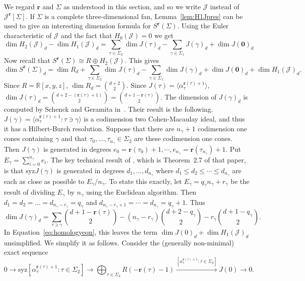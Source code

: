 \documentclass[11pt, reqno]{amsart}
\newcommand{\RR}{\mathbb{R}}
\newcommand{\br}{\mathbf{r}}
\newcommand{\calJ}{\mathcal{J}}
\newcommand{\syz}{\mathrm{syz}}
\theoremstyle{definition}
\theoremstyle{remark}
\numberwithin{equation}{section}
\begin{document}
We regard $\br$ and $\Sigma$ as understood in this section, and so we write $\calJ$ instead of $\calJ^\br[\Sigma]$.  If $\Sigma$ is a complete three-dimensional fan, Lemma~\ref{lem:H1Jpres} can be used to give an interesting dimension formula for $S^\br(\Sigma)$.  Using the Euler characteristic of $\calJ$ and the fact that $H_0(\calJ)=0$ we get
\[
\dim H_2(\calJ)_d-\dim H_1(\calJ)_d=\sum_{\tau\in\Sigma_2} \dim J(\tau)_d-\sum_{\gamma\in\Sigma_1} J(\gamma)_d+\dim J(\mathbf{0})_d
\]
Now recall that $S^\br(\Sigma)\cong R\oplus H_2(\calJ)$.  This gives
\begin{equation}\label{eq:homologyeqn}
\dim S^\br(\Sigma)_d =\dim R_d+\sum_{\tau\in\Sigma_2} \dim J(\tau)_d-\sum_{\gamma\in\Sigma_1} \dim J(\gamma)_d+\dim J(\mathbf{0})_d+\dim H_1(\calJ)_d.
\end{equation}
Since $R=\RR[x,y,z]$, $\dim R_d=\binom{d+2}{2}$.  Since $J(\tau)=\langle \alpha_\tau^{\br(\tau)+1}\rangle$, $\dim J(\tau)_d=\binom{d+2-(\br(\tau)+1)}{2}=\binom{d+1-\br(\tau)}{2}$.  The dimension of $J(\gamma)_d$ is computed by Schenck and Geramita in~\cite{FatPoints}.  Their result is the following.  $J(\gamma)=\langle \alpha_\tau^{\br(\tau)+1}: \tau\ni\gamma\rangle$ is a codimension two Cohen-Macaulay ideal, and thus it has a Hilbert-Burch resolution.  Suppose that there are $n_\gamma+1$ codimension one cones containing $\gamma$ and that $\tau_0,\ldots,\tau_{n_{\gamma}}\in\Sigma_2$ are these codimension one cones.  Then $J(\gamma)$ is generated in degrees $e_0=\br(\tau_0)+1,\cdots,e_{n_\gamma}=\br(\tau_{n_{\gamma}})+1$.  Put $E_\gamma=\sum_{i=0}^{n_\gamma} e_i$.  The key technical result of \cite{FatPoints}, which is Theorem~2.7 of that paper, is that $\syz J(\gamma)$ is generated in degrees $d_1,\ldots,d_{n_\gamma}$ where $d_1\le d_2\le \cdots\le d_{n_\gamma}$ are each as close as possible to $E_\gamma/n_{\gamma}$.  To state this exactly, let $E_\gamma=q_\gamma n_\gamma + r_\gamma$ be the result of dividing $E_\gamma$ by $n_\gamma$ using the Euclidean algorithm.  Then $d_1=d_2=\ldots=d_{n_\gamma-r_\gamma}=q_\gamma$ and $d_{n_\gamma-r_\gamma+1}=\cdots=d_{n_\gamma}=q_\gamma+1$.  Thus
\[
\dim J(\gamma)_d=\sum_{\tau\ni \gamma} \binom{d+1-\br(\tau)}{2}-(n_\gamma-r_\gamma)\binom{d+2-q_\gamma}{2}-r_\gamma\binom{d+1-q_\gamma}{2}.
\]
In Equation~\eqref{eq:homologyeqn}, this leaves the term $\dim J(0)_d+\dim H_1(\calJ)_d$ unsimplified.  We simplify it as follows.  Consider the (generally non-minimal) exact sequence
\[
0\rightarrow \syz [\alpha_{\tau}^{\br(\tau)+1}: \tau\in\Sigma_2] \to \bigoplus_{\tau\in\Sigma_2} R(-\br(\tau)-1) \xrightarrow{[\alpha_{\tau}^{\br(\tau)+1}: \tau\in\Sigma_2]} J(0) \rightarrow 0.
\]
\end{document}
